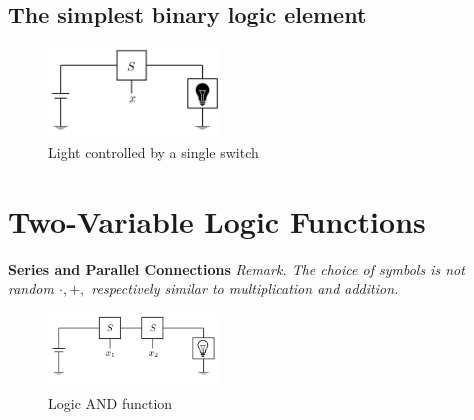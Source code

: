 \documentclass[12pt,openany, tikz,border=10pt]{book}
\begin{document}
			      	
			      	\subsection{The simplest binary logic element}
			      	
			      	
			      	\begin{figure}[htp] %
			      		\centering
			      		\includegraphics[width=0.41\textwidth]{circuits/6.1.2.png} %
			      		\caption*{Light controlled by a single switch}
			      	\end{figure}
			      	
			      	
			      	\newpage
			      	\section*{Two-Variable Logic Functions}
			      	\textbf{Series and Parallel Connections}
			      	\newline
			      	\vspace{10px}
			      	\textit{Remark. The choice of symbols is not random $\cdot, +,$ respectively similar to multiplication and addition.}
			      	\vspace{20px}
			      	\begin{figure}[htp] %
			      		\centering
			      		\includegraphics[width=0.41\textwidth]{circuits/6.1.3.png} %
			      		\caption*{Logic AND function}
			      	\end{figure}
			      	
\end{document}
